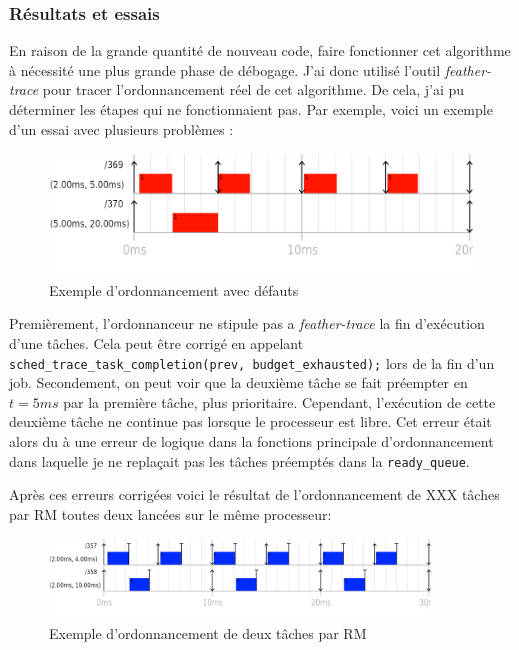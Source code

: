 \subsubsection{Résultats et essais}

En raison de la grande quantité de nouveau code, faire fonctionner cet algorithme à nécessité une plus grande phase de débogage. J'ai donc utilisé l'outil \textit{feather-trace} pour tracer l'ordonnancement réel de cet algorithme. De cela, j'ai pu déterminer les étapes qui ne fonctionnaient pas. Par exemple, voici un exemple d'un essai avec plusieurs problèmes : 
\begin{figure}[H]
    \centering
    \includegraphics[width=0.75\paperwidth]{Images/schedule_host=rock960_scheduler=DEMO_trace=notstoped.png}
    \caption{Exemple d'ordonnancement avec défauts}
\end{figure}

Premièrement, l’ordonnanceur ne stipule pas a \textit{feather-trace} la fin d'exécution d'une tâches. Cela peut être corrigé en  appelant \texttt{sched\_trace\_task\_completion(prev, budget\_exhausted);} lors de la fin d'un job.
Secondement, on peut voir que la deuxième tâche se fait préempter en $t=5ms$ par la première tâche, plus prioritaire. Cependant, l'exécution de cette deuxième tâche ne continue pas lorsque le processeur est libre. Cet erreur était alors du à une erreur de logique dans la fonctions principale d’ordonnancement dans laquelle je ne replaçait pas les tâches préemptés dans la \texttt{ready\_queue}.

Après ces erreurs corrigées voici le résultat de l’ordonnancement de \color{red}XXX \color{black} tâches par RM toutes deux lancées sur le même processeur:

\begin{figure}[H]
    \centering
    \includegraphics[width=0.9\textwidth]{Images/RM-No-Offset.png}
    \caption{Exemple d'ordonnancement de deux tâches par RM}
    \label{fig:rm-schedualibility-demo}
\end{figure}


